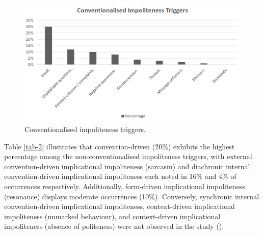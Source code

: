 \documentclass[english]{textolivre}
\begin{document}
\begin{figure}[h!]
    \centering
    \begin{minipage}{0.85\linewidth}
    \includegraphics[width=\linewidth]{imagens/figura1.png}
    \caption{Conventionalised impoliteness triggers.}\label{fig-1}
    \end{minipage}
\end{figure}

Table \ref{tab-2} illustrates that convention-driven (20\%) exhibits the highest percentage among the non-conventionalised impoliteness triggers, with external convention-driven implicational impoliteness (sarcasm) and diachronic internal convention-driven implicational impoliteness each noted in 16\% and 4\% of occurrences respectively. Additionally, form-driven implicational impoliteness (resonance) displays moderate occurrences (10\%). Conversely, synchronic internal convention-driven implicational impoliteness, context-driven implicational impoliteness (unmarked behaviour), and context-driven implicational impoliteness (absence of politeness) were not observed in the study ().
\newpage
\end{document}
